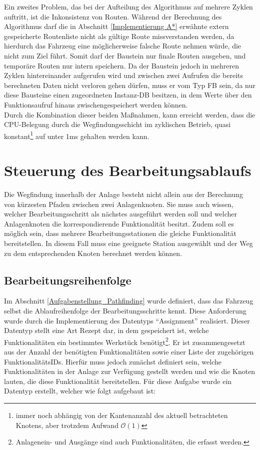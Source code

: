 			Ein zweites Problem, das bei der Aufteilung des Algorithmus auf mehrere Zyklen auftritt, ist die Inkonsistenz von Routen. Während der Berechnung des Algorithmus darf die in Abschnitt \ref{Implementierung A*} erwähnte extern gespeicherte Routenliste nicht als gültige Route missverstanden werden, da hierdurch das Fahrzeug eine möglicherweise falsche Route nehmen würde, die nicht zum Ziel führt. Somit darf der Baustein nur finale Routen ausgeben, und temporäre Routen nur intern speichern. Da der Baustein jedoch in mehreren Zyklen hintereinander aufgerufen wird und zwischen zwei Aufrufen die bereits berechneten Daten nicht verloren gehen dürfen, muss er vom Typ \ac{FB} sein, da nur diese Bausteine einen zugeordneten Instanz-\acl{DB} besitzen, in dem Werte über den Funktionsaufruf hinaus zwischengespeichert werden können.
			\\[4pt]
			Durch die Kombination dieser beiden Maßnahmen, kann erreicht werden, dass die CPU-Belegung durch die Wegfindungsschicht im zyklischen Betrieb, quasi konstant\footnote{immer noch abhängig von der Kantenanzahl des aktuell betrachteten Knotens, aber trotzdem Aufwand $\mathcal{O}(1)$} auf unter 1ms gehalten werden kann.
		
	\section{Steuerung des Bearbeitungsablaufs}
		
		Die Wegfindung innerhalb der Anlage besteht nicht allein aus der Berechnung von kürzesten Pfaden zwischen zwei Anlagenknoten. Sie muss auch wissen, welcher Bearbeitungsschritt als nächstes ausgeführt werden soll und welcher Anlagenknoten die korrespondierende Funktionalität besitzt. Zudem soll es möglich sein, dass mehrere Bearbeitungsstationen die gleiche Funktionalität bereitstellen. In diesem Fall muss eine geeignete Station ausgewählt und der Weg zu dem entsprechenden Knoten berechnet werden können.
	
		\subsection{Bearbeitungsreihenfolge}
			\label{Bearbeitungsreihenfolge}
			Im Abschnitt \ref{Aufgabenstellung_Pathfinding} wurde definiert, dass das Fahrzeug selbst die Ablaufreihenfolge der Bearbeitungsschritte kennt. Diese Anforderung wurde durch die Implementierung des Datentyps "`Assignment"' realisiert. Dieser Datentyp stellt eine Art Rezept dar, in dem gespeichert ist, welche Funktionalitäten ein bestimmtes Werkstück benötigt\footnote{Anlagenein- und Ausgänge sind auch Funktionalitäten, die erfasst werden.}. Er ist zusammengesetzt aus der Anzahl der benötigten Funktionalitäten sowie einer Liste der zugehörigen FunktionalitätsIDs. Hierfür muss jedoch zunächst definiert sein, welche Funktionalitäten in der Anlage zur Verfügung gestellt werden und wie die Knoten lauten, die diese Funktionalität bereitstellen. Für diese Aufgabe wurde ein Datentyp erstellt, welcher wie folgt aufgebaut ist:
			
